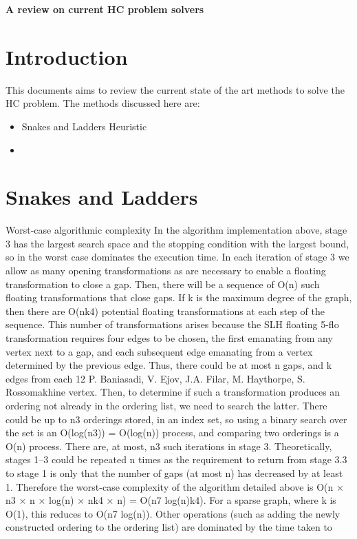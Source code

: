 \documentclass[10pt,a4paper]{article}
\begin{document}
\textbf{A review on current HC problem solvers}\\
\section{Introduction}
This documents aims to review the current state of the art methods to solve the HC problem. The methods discussed here are:
\begin{itemize}
\item Snakes and Ladders Heuristic
\item 
\end{itemize}

\section{Snakes and Ladders}
Worst-case algorithmic complexity
In the algorithm implementation above, stage 3 has the largest search space and the stopping
condition with the largest bound, so in the worst case dominates the execution time. In each
iteration of stage 3 we allow as many opening transformations as are necessary to enable a
floating transformation to close a gap. Then, there will be a sequence of O(n) such floating
transformations that close gaps. If k is the maximum degree of the graph, then there are O(nk4)
potential floating transformations at each step of the sequence. This number of transformations
arises because the SLH floating 5-flo transformation requires four edges to be chosen, the first
emanating from any vertex next to a gap, and each subsequent edge emanating from a vertex
determined by the previous edge. Thus, there could be at most n gaps, and k edges from each
12 P. Baniasadi, V. Ejov, J.A. Filar, M. Haythorpe, S. Rossomakhine
vertex. Then, to determine if such a transformation produces an ordering not already in the
ordering list, we need to search the latter. There could be up to n3 orderings stored, in an index
set, so using a binary search over the set is an O(log(n3)) = O(log(n)) process, and comparing
two orderings is a O(n) process. There are, at most, n3 such iterations in stage 3. Theoretically,
stages 1–3 could be repeated n times as the requirement to return from stage 3.3 to stage 1 is
only that the number of gaps (at most n) has decreased by at least 1. Therefore the worst-case
complexity of the algorithm detailed above is O(n × n3 × n × log(n) × nk4 × n) = O(n7 log(n)k4).
For a sparse graph, where k is O(1), this reduces to O(n7 log(n)). Other operations (such as
adding the newly constructed ordering to the ordering list) are dominated by the time taken to
\end{document}
